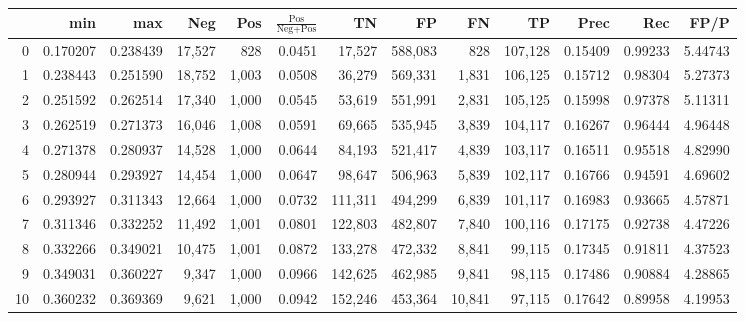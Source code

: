 \begin{tabular}{rrrrrrrrrrrrr}
\toprule
{} &       min &       max &     Neg &    Pos & $\frac{\text{Pos}}{\text{Neg}+\text{Pos}}$ &       TN &       FP &       FN &       TP &     Prec &      Rec &     FP/P \\
\midrule
0   &  0.170207 &  0.238439 &  17,527 &    828 &                                     0.0451 &   17,527 &  588,083 &      828 &  107,128 &  0.15409 &  0.99233 &  5.44743 \\
1   &  0.238443 &  0.251590 &  18,752 &  1,003 &                                     0.0508 &   36,279 &  569,331 &    1,831 &  106,125 &  0.15712 &  0.98304 &  5.27373 \\
2   &  0.251592 &  0.262514 &  17,340 &  1,000 &                                     0.0545 &   53,619 &  551,991 &    2,831 &  105,125 &  0.15998 &  0.97378 &  5.11311 \\
3   &  0.262519 &  0.271373 &  16,046 &  1,008 &                                     0.0591 &   69,665 &  535,945 &    3,839 &  104,117 &  0.16267 &  0.96444 &  4.96448 \\
4   &  0.271378 &  0.280937 &  14,528 &  1,000 &                                     0.0644 &   84,193 &  521,417 &    4,839 &  103,117 &  0.16511 &  0.95518 &  4.82990 \\
5   &  0.280944 &  0.293927 &  14,454 &  1,000 &                                     0.0647 &   98,647 &  506,963 &    5,839 &  102,117 &  0.16766 &  0.94591 &  4.69602 \\
6   &  0.293927 &  0.311343 &  12,664 &  1,000 &                                     0.0732 &  111,311 &  494,299 &    6,839 &  101,117 &  0.16983 &  0.93665 &  4.57871 \\
7   &  0.311346 &  0.332252 &  11,492 &  1,001 &                                     0.0801 &  122,803 &  482,807 &    7,840 &  100,116 &  0.17175 &  0.92738 &  4.47226 \\
8   &  0.332266 &  0.349021 &  10,475 &  1,001 &                                     0.0872 &  133,278 &  472,332 &    8,841 &   99,115 &  0.17345 &  0.91811 &  4.37523 \\
9   &  0.349031 &  0.360227 &   9,347 &  1,000 &                                     0.0966 &  142,625 &  462,985 &    9,841 &   98,115 &  0.17486 &  0.90884 &  4.28865 \\
10  &  0.360232 &  0.369369 &   9,621 &  1,000 &                                     0.0942 &  152,246 &  453,364 &   10,841 &   97,115 &  0.17642 &  0.89958 &  4.19953 \\

\end{tabular}
